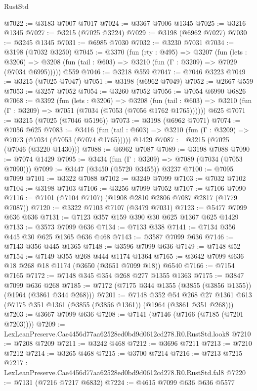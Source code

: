 \begin{lexlean}{RustStd}
\begin{coremodule}
@7022 := @3183 @7007 @7017
@7024 := @3367 @7006 @1345
@7025 := @3216 @1345
@7027 := @3215 (@7025 @3224)
@7029 := @3198 (@6962 @7027)
@7030 := @3245 @1345
@7031 := @6985 @7030
@7032 := @3230 @7031
@7034 := @3198 (@7032 @3250)
@7045 := @3370
    (fun (rty : @495) =>
    @3207
      (fun (lets : @3206) =>
      @3208 (fun (tail : @603) => @3210 (fun (Γ : @3209) => @7029 (@7034 @6995)))))
    @559
@7046 := @3218 @559
@7047 := @7046 @3223
@7049 := @3215 (@7025 @7047)
@7051 := @3198 (@6962 @7049)
@7052 := @2667 @559
@7053 := @3257 @7052
@7054 := @3260 @7052
@7056 := @7054 @6990 @6826
@7068 := @3392
    (fun (lets : @3206) =>
    @3208
      (fun (tail : @603) => @3210 (fun (Γ : @3209) => @7051 (@7034 (@7053 (@7056 @1762 @1765))))))
    @625
@7071 := @3215 (@7025 (@7046 @5196))
@7073 := @3198 (@6962 @7071)
@7074 := @7056 @625
@7083 := @3416
    (fun (tail : @603) => @3210 (fun (Γ : @3209) => @7073 (@7034 (@7053 (@7074 @1765)))))
    @1429
@7087 := @3215 (@7025 (@7046 (@3220 @1430)))
@7088 := @6962 @7087
@7089 := @3198 @7088
@7090 := @7074 @1429
@7095 := @3434 (fun (Γ : @3209) => @7089 (@7034 (@7053 @7090)))
@7099 := @3447 (@3450 (@5720 @3455)) @3237
@7100 := @7095 @7099
@7101 := @3322 @7088
@7102 := @3249 @7099
@7103 := @7032 @7102
@7104 := @3198 @7103
@7106 := @3256 @7099 @7052
@7107 := @7106 @7090
@7116 := @7101 (@7104 @7107) (@1908 @2810 @2806 @7087 @2817 (@1779 @7087))
@7120 := @3322 @7103 @7107 (@3479 @7031)
@7123 := @5477 @7099 @636 @636
@7131 := @7123 @357 @159 @390 @30 @625 @1367 @625 @1429
@7133 := @3573 @7099 @636
@7134 := @7133 @338
@7141 := @7134 @356 @445 @30 @625 @1365 @636 @468
@7143 := @3587 @7099 @636
@7146 := @7143 @356 @445 @1365
@7148 := @3596 @7099 @636
@7149 := @7148 @52
@7154 := @7149 @355 @268 @444 @1174 @1364
@7165 := @3642 @7099 @636 @18 @268 @18 @1174 (@3650 (@3651 @7099 @18)) @6540
@7166 := @7154 @7165
@7172 := @7148 @345 @354 @268 @277 @1355 @1363
@7175 := @3847 @7099 @636 @268
@7185 := @7172 (@7175 @344 @1355 (@3855 (@3856 @1355)) (@1964 (@3861 @344 @268)))
@7201 := @7148
    @352
    @54
    @268
    @27
    @1361
    @613
    (@7175 @351 @1361 (@3855 (@3856 @1361)) (@1964 (@3861 @351 @268)))
@7203 := @3667 @7099 @636
@7208 := @7141 (@7146 (@7166 (@7185 (@7201 @7203))))
@7209 := LexLeanPreserve.Cae4456d77aa62528ed0bd9d0612cd278.R0.RustStd.look8
@7210 := @7208 @7209
@7211 := @3242 @468
@7212 := @3696 @7211
@7213 := @7210 @7212
@7214 := @3265 @468
@7215 := @3700 @7214
@7216 := @7213 @7215
@7217 := LexLeanPreserve.Cae4456d77aa62528ed0bd9d0612cd278.R0.RustStd.fal8
@7220 := @7131 (@7216 @7217 @6832)
@7224 := @4615 @7099 @636 @636 @5577

\end{coremodule}
\end{lexlean}
